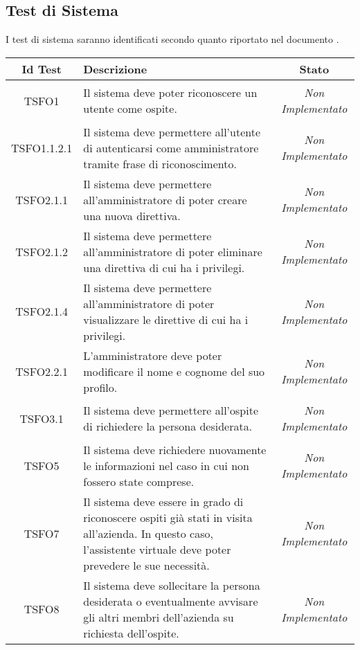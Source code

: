 \subsection{Test di Sistema}
I test di sistema saranno identificati secondo quanto riportato nel documento \NPdoc{}.
\normalsize
\begin{longtable}{|c|>{}m{8cm}|c|}
	\hline
	\textbf{Id Test} & \textbf{Descrizione} & \textbf{Stato}\\
	\hline
	\endhead
	\hypertarget{TSFO1}{TSFO1} & Il sistema deve poter riconoscere un utente come ospite. & \textit{Non Implementato}\\ \hline
	\hypertarget{TSFO1.1.2.1}{TSFO1.1.2.1} & Il sistema deve permettere all'utente di autenticarsi come amministratore tramite frase di riconoscimento. & \textit{Non Implementato}\\ \hline
	\hypertarget{TSFO2.1.1}{TSFO2.1.1} & Il sistema deve permettere all'amministratore di poter creare una nuova direttiva. & \textit{Non Implementato}\\ \hline
	\hypertarget{TSFO2.1.2}{TSFO2.1.2} & Il sistema deve permettere all'amministratore di poter eliminare una direttiva di cui ha i privilegi. & \textit{Non Implementato}\\ \hline
	\hypertarget{TSFO2.1.4}{TSFO2.1.4} & Il sistema deve permettere all'amministratore di poter visualizzare le direttive di cui ha i privilegi. & \textit{Non Implementato}\\ \hline
	\hypertarget{TSFO2.2.1}{TSFO2.2.1} & L'amministratore deve poter modificare il nome e cognome del suo profilo. & \textit{Non Implementato}\\ \hline
	\hypertarget{TSFO3.1}{TSFO3.1} & Il sistema deve permettere all'ospite di richiedere la persona desiderata. & \textit{Non Implementato}\\ \hline
	\hypertarget{TSFO5}{TSFO5} & Il sistema deve richiedere nuovamente le informazioni nel caso in cui non fossero state comprese. & \textit{Non Implementato}\\ \hline
	\hypertarget{TSFO7}{TSFO7} & Il sistema deve essere in grado di riconoscere ospiti già stati in visita all'azienda. In questo caso, l'assistente virtuale deve poter prevedere le sue necessità. & \textit{Non Implementato}\\ \hline
	\hypertarget{TSFO8}{TSFO8} & Il sistema deve sollecitare la persona desiderata o eventualmente avvisare gli altri membri dell'azienda su richiesta dell'ospite. & \textit{Non Implementato}\\ \hline

\end{longtable}

